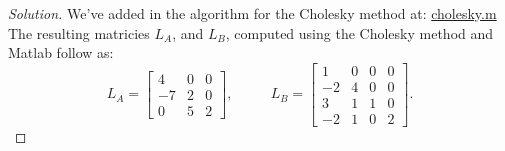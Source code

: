 \documentclass[12pt]{amsart}
\newenvironment{solution}
{\begin{proof}[Solution]}
{\end{proof}}
\begin{document}
\begin{onehalfspace}
\begin{solution}
            We've added in the algorithm for the Cholesky method at:
            \href{https://github.com/chtompki/MathSpring2026/tree/main/NumericalAnalysis/ProblemSet2/cholesky.m}{cholesky.m}
            The resulting matricies $L_A$, and $L_B$, computed using the Cholesky method and Matlab follow as:
            \begin{displaymath}
                L_A = \left[\begin{matrix}
                              4 & 0 & 0\\
                              -7 & 2 & 0 \\
                              0 & 5 & 2
                \end{matrix}\right],
                \quad\text{ }\quad
                L_B = \left[\begin{matrix}
                                1   &  0  &   0  &   0\\
                               -2   &  4  &   0  &   0\\
                                3   &  1  &   1  &   0\\
                               -2   &  1  &   0  &   2
                \end{matrix}\right].
            \end{displaymath}

        \end{solution}
    \end{onehalfspace}
\end{document}
